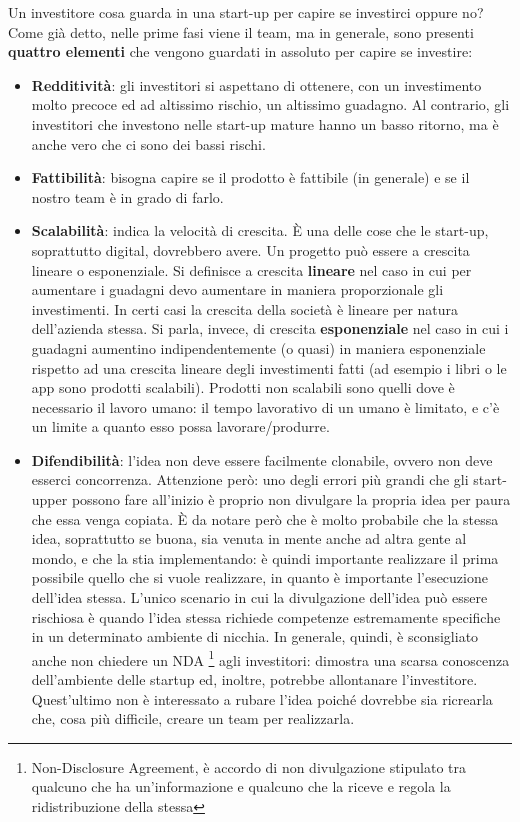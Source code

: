 Un investitore cosa guarda in una start-up per capire se investirci oppure no?
Come già detto, nelle prime fasi viene il team, ma in generale, sono presenti
\textbf{quattro elementi} che vengono guardati in assoluto per capire se
investire:
\begin{itemize}
 \item \textbf{Redditività}: gli investitori si aspettano di ottenere, con un
 investimento molto precoce ed ad altissimo rischio, un altissimo guadagno. Al
 contrario, gli investitori che investono nelle start-up mature hanno un basso
 ritorno, ma è anche vero che ci sono dei bassi rischi.
 \item \textbf{Fattibilità}: bisogna capire se il prodotto è fattibile (in
 generale) e se il nostro team è in grado di farlo.
 \item \textbf{Scalabilità}: indica la velocità di crescita. È una delle cose
 che le start-up, soprattutto digital, dovrebbero avere. Un progetto può essere
 a crescita lineare o esponenziale. Si definisce a crescita \textbf{lineare}
 nel caso in cui per aumentare i guadagni devo aumentare in maniera
 proporzionale gli investimenti. In certi casi la crescita della società è
 lineare per natura dell'azienda stessa. Si parla, invece, di crescita
 \textbf{esponenziale} nel caso in cui i guadagni aumentino indipendentemente (o
 quasi) in maniera esponenziale rispetto ad una crescita lineare degli
 investimenti fatti (ad esempio i libri o le app sono prodotti scalabili).
 Prodotti non scalabili sono quelli dove è necessario il lavoro umano: il tempo
 lavorativo di un umano è limitato, e c'è un limite a quanto esso possa
 lavorare/produrre.
 \item \textbf{Difendibilità}: l'idea non deve essere facilmente clonabile,
 ovvero non deve esserci concorrenza. Attenzione però: uno degli errori più
 grandi che gli start-upper possono fare all'inizio è proprio non divulgare la
 propria idea per paura che essa venga copiata. È da notare però che è molto
 probabile che la stessa idea, soprattutto se buona, sia venuta in mente anche
 ad altra gente al mondo, e che la stia implementando: è quindi importante
 realizzare il prima possibile quello che si vuole realizzare, in quanto è
 importante l'esecuzione dell'idea stessa. L'unico scenario in cui la
 divulgazione dell'idea può essere rischiosa è quando l'idea stessa richiede
 competenze estremamente specifiche in un determinato ambiente di nicchia. In
 generale, quindi, è sconsigliato anche non chiedere un
 NDA \footnote{Non-Disclosure Agreement, è accordo di non divulgazione stipulato
 tra qualcuno che ha un'informazione e qualcuno che la riceve e regola la
 ridistribuzione della stessa} agli investitori: dimostra una scarsa conoscenza
 dell'ambiente delle startup ed, inoltre, potrebbe allontanare l'investitore.
 Quest'ultimo non è interessato a rubare l'idea poiché dovrebbe sia ricrearla
 che, cosa più difficile, creare un team per realizzarla.


\end{itemize}
